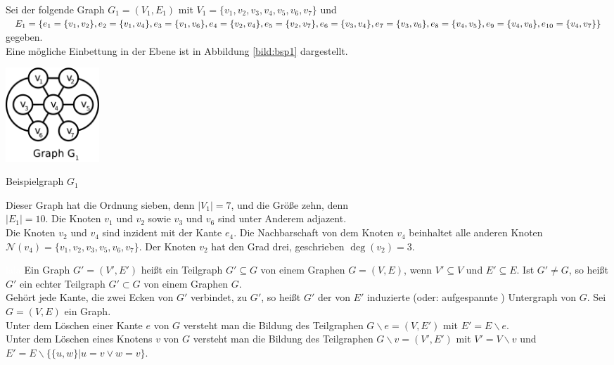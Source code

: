 \begin{bsp}
Sei der folgende Graph $G_1=(V_1,E_1)$ mit $V_1=\{v_1,v_2,v_3,v_4,v_5,v_6,v_7\}$ und \\$E_1=\{e_1=\{v_1,v_2\},e_2=\{v_1,v_4\},e_3=\{v_1,v_6\},e_4=\{v_2,v_4\},e_5=\{v_2,v_7\},e_6=\{v_3,v_4\},\\e_7=\{v_3,v_6\},e_8=\{v_4,v_5\},e_9=\{v_4,v_6\},e_{10}=\{v_4,v_7\}\}$ gegeben.\\Eine mögliche Einbettung in der Ebene ist in Abbildung \ref{bild:bsp1} dargestellt.
\begin{floatingfigure}[r]{200pt}
\centering
\includegraphics*[width = 100pt]{bilder/bsp2,1.pdf}
\caption{Beispielgraph $G_1$}
\label{bild:bsp1}
\end{floatingfigure}  	 
\vspace{-2mm}
Dieser Graph hat die Ordnung sieben, denn $|V_1|=7$, und die Größe zehn, denn\\$|E_1|=10$. Die Knoten $v_1$ und $v_2$ sowie $v_3$ und $v_6$ sind unter Anderem adjazent.\\Die Knoten $v_2$ und $v_4$ sind inzident mit der Kante $e_4$. Die Nachbarschaft von dem Knoten $v_4$ beinhaltet alle anderen Knoten $\mathcal{N}(v_4)=\{v_1,v_2,v_3,v_5,v_6,v_7\}$. Der Knoten $v_2$ hat den Grad drei, geschrieben $\deg(v_2)=3$. 
\end{bsp}
\textcolor{white}{lala}\newline
Ein Graph $G'=(V',E')$ heißt ein Teilgraph $G'\subseteq G$ von einem Graphen $G=(V,E)$, wenn $V'\subseteq V$ und $E'\subseteq E$. Ist $G' \neq G$, so heißt $G'$ ein echter Teilgraph $G'\subset G$ von einem Graphen $G$.\\Gehört jede Kante, die zwei Ecken von $G'$ verbindet, zu $G'$, so heißt $G'$ der von $E'$ induzierte (oder: aufgespannte ) Untergraph von $G$. Sei $G=(V,E)$ ein Graph.\\Unter dem Löschen einer Kante $e$ von $G$ versteht man die Bildung des Teilgraphen $G \backslash e = (V, E')$ mit $E'=E  \backslash e$.\\Unter dem Löschen eines Knotens $v$ von $G$ versteht man die Bildung des Teilgraphen $G \backslash v = (V', E')$ mit $V'=V  \backslash v$ und $E'=E \backslash \{\{u, w\} | u=v \vee w = v\}$.
